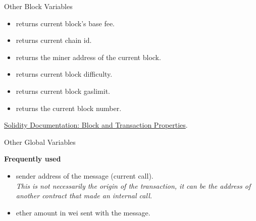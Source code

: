 \documentclass[]{beamer}
\begin{document}
\begin{frame}{Other Block Variables }

\begin{itemize}
	\item {} returns current block’s base fee.
	\item {} returns current chain id.
	\item {} returns the miner address of the current block.
	\item {} returns current block difficulty.
	\item {} returns current block gaslimit.
	\item {} returns the current block number.
\end{itemize}

\vspace{1.5em}

\link \href{https://docs.soliditylang.org/en/v0.8.9/units-and-global-variables.html}{Solidity Documentation: Block and Transaction Properties}.

	
\end{frame}


\begin{frame}{Other Global Variables}

\textbf{Frequently used}
\begin{itemize}
	\item {} sender address of the message (current call).\\
		\textit{This is not necessarily the origin of the transaction, it can be the address of another contract that made an internal call.}
	\item {} ether amount in wei sent with the message.
\end{itemize}

\vspace{0.5em}

	
\end{frame}
\end{document}
